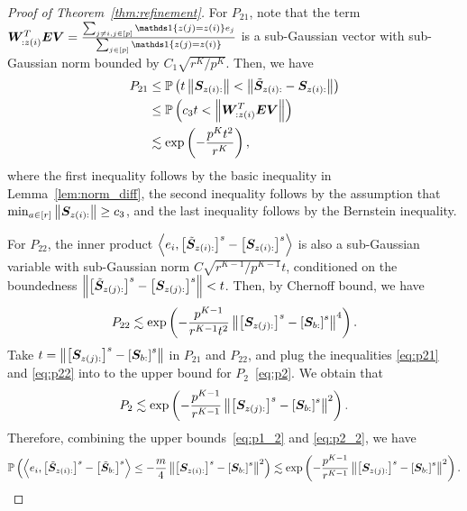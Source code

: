 \documentclass[lettersize,journal]{IEEEtran}
\theoremstyle{definition}
\theoremstyle{definition}
\newcommand{\of}[1]{\left(#1\right)}
\newcommand{\off}[1]{\left[#1\right]}
\newcommand{\ang}[1]{\left\langle#1\right\rangle}
\begin{document}
\begin{proof}[Proof of Theorem~\ref{thm:refinement}]
    For $P_{21}$, note that the term $\mW^T_{: z(i)} \mE \mV = \frac{ \sum_{ j \neq i, j \in [p]} \ind \{ z(j) = z(i) \} e_j }{\sum_{j \in [p]} \ind \{ z(j) = z(i) \} }$  is a sub-Gaussian vector with sub-Gaussian norm bounded by $C_1 \sqrt{r^K/ p^K}$. Then, we have 
    \begin{align}
        P_{21} &\leq \bbP\of{ t \onorm{\mS_{z(i):} } < \onorm{ \tilde  \mS_{z(i):}  -  \mS_{z(i):} }  }\\
        & \leq \bbP\of{c_3 t <   \onorm{ \mW^T_{: z(i)} \mE \mV  } } \\
        & \lesssim \exp\of{ - \frac{p^K t^2}{r^K} }, \label{eq:p21}
    \end{align}
    where the first inequality follows by the basic inequality in Lemma~\ref{lem:norm_diff}, the second inequality follows by the assumption that $ \min_{a \in [r]} \left\lVert\bm S_{z(i):}\right\rVert \geq c_3$, and the last inequality follows by the Bernstein inequality.
    
    For $P_{22}$, the inner product $ \ang{e_i, \off{ \tilde  \mS_{z(i):} }^s - \off{ \mS_{z(i):} }^s}$ is also a sub-Gaussian variable with sub-Gaussian norm $ C \sqrt{ r^{K-1}/ p^{K-1} } t$, conditioned on the boundedness $\onorm{ \off{ \tilde  \mS_{z(j):} }^s - \off{ \mS_{z(j):} }^s } < t$. Then, by Chernoff bound, we have 
    \begin{equation}\label{eq:p22}
        P_{22} \lesssim \exp \of{  - \frac{p^{K-1}}{r^{K-1} t^2}   \onorm{ \off{ \mS_{z(j):}  }^s - \off{ \mS_{b:}  }^s  }^4 }. 
    \end{equation}
    Take $t =  \onorm{ \off{ \mS_{z(j):}  }^s - \off{ \mS_{b:}  }^s  }$ in $P_{21}$ and $P_{22}$, and plug the inequalities \eqref{eq:p21} and \eqref{eq:p22} into to the upper bound for $P_2$~\eqref{eq:p2}. We obtain that 
    \begin{equation}\label{eq:p2_2}
        P_2 \lesssim \exp \of{  - \frac{p^{K-1}}{r^{K-1}}   \onorm{ \off{ \mS_{z(j):}  }^s - \off{ \mS_{b:}  }^s  }^2 }.
    \end{equation}
    Therefore, combining the upper bounds~\eqref{eq:p1_2} and \eqref{eq:p2_2}, we have 
    \begin{equation}\label{eq:xi_p}
          \bbP \of{ \ang{ e_i, \off{  \tilde \mS_{z(i):} }^s - \off{  \tilde \mS_{b:} }^s }  \leq - \frac{ m}{4} \onorm{ \off{ \mS_{z(i):}  }^s - \off{ \mS_{b:}  }^s  }^2} \lesssim  \exp \of{  - \frac{p^{K-1}}{r^{K-1}}   \onorm{ \off{ \mS_{z(j):}  }^s - \off{ \mS_{b:}  }^s  }^2 }.
    \end{equation}
    

\end{proof}
\end{document}
